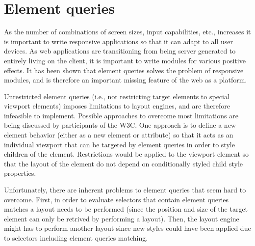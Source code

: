 \documentclass[a4paper,11pt]{kth-mag}
\begin{document}






    \section{Element queries}
    As the number of combinations of screen sizes, input capabilities, etc., increases it is important to write \gls{responsive} applications so that it can adapt to all user devices.
    As \gls{web} applications are transitioning from being server generated to entirely living on the client, it is important to write modules for various positive effects.
    It has been shown that element queries solves the problem of \gls{responsive} modules, and is therefore an important missing feature of the \gls{web} as a platform.

    Unrestricted element queries (i.e., not restricting target \glspl{element} to special \gls{viewport} \glspl{element}) imposes limitations to \glspl{layout engine}, and are therefore infeasible to implement.
    Possible approaches to overcome most limitations are being discussed by participants of the W3C.
    One approach is to define a new element behavior (either as a new element or attribute) so that it acts as an individual \gls{viewport} that can be targeted by element queries in order to style children of the \gls{element}.
    Restrictions would be applied to the \gls{viewport} element so that the layout of the element do not depend on conditionally styled child style properties.

    Unfortunately, there are inherent problems to element queries that seem hard to overcome.
    First, in order to evaluate selectors that contain element queries matches a layout needs to be performed (since the position and size of the target element can only be retrived by performing a layout).
    Then, the \gls{layout engine} might has to perform another layout since new styles could have been applied due to selectors including element queries matching.
\end{document}
